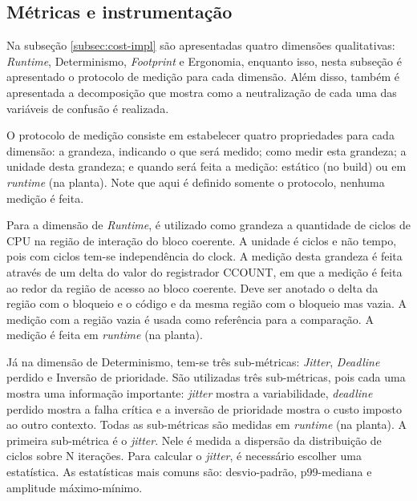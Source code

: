 \subsection{Métricas e instrumentação}

Na subseção \ref{subsec:cost-impl} são apresentadas quatro dimensões qualitativas: \textit{Runtime}, Determinismo, \textit{Footprint} e Ergonomia, enquanto isso, nesta subseção é apresentado o protocolo de medição para cada dimensão. Além disso, também é apresentada a decomposição que mostra como a neutralização de cada uma das variáveis de confusão é realizada.

O protocolo de medição consiste em estabelecer quatro propriedades para cada dimensão: a grandeza, indicando o que será medido; como medir esta grandeza; a unidade desta grandeza; e quando será feita a medição: estático (no build) ou em \textit{runtime} (na planta). Note que aqui é definido somente o protocolo, nenhuma medição é feita.

Para a dimensão de \textit{Runtime}, é utilizado como grandeza a quantidade de ciclos de \ac{CPU} na região de interação do bloco coerente. A unidade é ciclos e não tempo, pois com ciclos tem-se independência do clock. A medição desta grandeza é feita através de um delta do valor do registrador CCOUNT, em que a medição é feita ao redor da região de acesso ao bloco coerente. Deve ser anotado o delta da região com o bloqueio e o código e da mesma região com o bloqueio mas vazia. A medição com a região vazia é usada como referência para a comparação. A medição é feita em \textit{runtime} (na planta).

Já na dimensão de Determinismo, tem-se três sub-métricas: \textit{Jitter}, \textit{Deadline} perdido e Inversão de prioridade. São utilizadas três sub-métricas, pois cada uma mostra uma informação importante: \textit{jitter} mostra a variabilidade, \textit{deadline} perdido mostra a falha crítica e a inversão de prioridade mostra o custo imposto ao outro contexto. Todas as sub-métricas são medidas em \textit{runtime} (na planta). A primeira sub-métrica é o \textit{jitter}. Nele é medida a dispersão da distribuição de ciclos sobre N iterações. Para calcular o \textit{jitter}, é necessário escolher uma estatística. As estatísticas mais comuns são: desvio-padrão, p99-mediana e amplitude máximo-mínimo.

